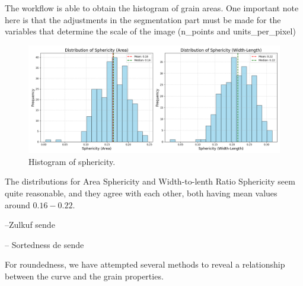 \documentclass{article}
\begin{document}
The workflow is able to obtain the histogram of grain areas. One important note here is that the adjustments in the segmentation part must be made for the variables that determine the scale of the image (n\_points and units\_per\_pixel)

\begin{figure}[H]
    \centering
    \includegraphics[width=\textwidth]{sphericity_histogram.png}
    \caption{Histogram of sphericity.}
    \label{fig:sphericity_histogram}
\end{figure}

The distributions for Area Sphericity and Width-to-lenth Ratio Sphericity seem quite reasonable, and they agree with each other, both having mean values around $0.16-0.22$.

--Zulkuf sende

-- Sortedness de sende

For roundedness, we have attempted several methods to reveal a relationship between the curve and the grain properties.
\end{document}
